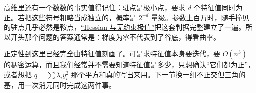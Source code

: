 高维里还有一个数数的事实值得记住：驻点是极小点，要求 \(d\) 个特征值同时为正。若把这些符号粗略当成独立的，概率是 \(2^{-d}\) 量级。参数上百万时，随手撞见的驻点几乎必然是鞍点，\hyperref[sec:02-Calculus/06-Multivariable-Calculus/05]{``Hessian 与无约束极值''}把这套判据完整建立了一遍。所以开头那个问题的答案通常是：梯度为零不代表到了谷底，得看曲率。

正定性到这里已经完全由特征值刻画了。可是求特征值本身要迭代，要 \(O(n^3)\) 的稠密运算，而且我们经常并不需要知道特征值是多少，只想确认``它们都为正''，或者想把 \(q=\sum\lambda_iy_i^2\) 那个平方和真的写出来用。下一节换一组不正交但三角的基，用一次消元同时完成这两件事。
